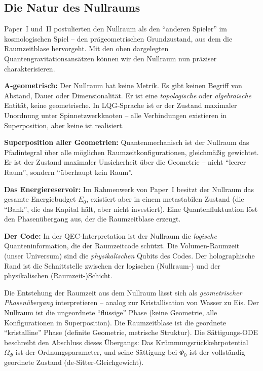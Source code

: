\documentclass[11pt,a4paper]{article}
\begin{document}
\subsection{Die Natur des Nullraums}
\label{subsec:null_space}

Paper~I und~II postulierten den Nullraum als den "`anderen Spieler"' im kosmologischen Spiel -- den pr\"ageometrischen Grundzustand, aus dem die Raumzeitblase hervorgeht. Mit den oben dargelegten Quantengravitationsans\"atzen k\"onnen wir den Nullraum nun pr\"aziser charakterisieren.

\textbf{A-geometrisch:} Der Nullraum hat keine Metrik. Es gibt keinen Begriff von Abstand, Dauer oder Dimensionalit\"at. Er ist eine \textit{topologische} oder \textit{algebraische} Entit\"at, keine geometrische. In LQG-Sprache ist er der Zustand maximaler Unordnung unter Spinnetzwerkknoten -- alle Verbindungen existieren in Superposition, aber keine ist realisiert.

\textbf{Superposition aller Geometrien:} Quantenmechanisch ist der Nullraum das Pfadintegral \"uber alle m\"oglichen Raumzeitkonfigurationen, gleichm\"a\ss ig gewichtet. Er ist der Zustand maximaler Unsicherheit \"uber die Geometrie -- nicht "`leerer Raum"', sondern "`\"uberhaupt kein Raum"'.

\textbf{Das Energiereservoir:} Im Rahmenwerk von Paper~I besitzt der Nullraum das gesamte Energiebudget $E_0$, existiert aber in einem metastabilen Zustand (die "`Bank"', die das Kapital h\"alt, aber nicht investiert). Eine Quantenfluktuation l\"ost den Phasen\"ubergang aus, der die Raumzeitblase erzeugt.

\textbf{Der Code:} In der QEC-Interpretation ist der Nullraum die \textit{logische} Quanteninformation, die der Raumzeitcode sch\"utzt. Die Volumen-Raumzeit (unser Universum) sind die \textit{physikalischen} Qubits des Codes. Der holographische Rand ist die Schnittstelle zwischen der logischen (Nullraum-) und der physikalischen (Raumzeit-)Schicht.

Die Entstehung der Raumzeit aus dem Nullraum l\"asst sich als \textit{geometrischer Phasen\"ubergang} interpretieren -- analog zur Kristallisation von Wasser zu Eis. Der Nullraum ist die ungeordnete "`fl\"ussige"' Phase (keine Geometrie, alle Konfigurationen in Superposition). Die Raumzeitblase ist die geordnete "`kristalline"' Phase (definite Geometrie, metrische Struktur). Die S\"attigungs-ODE beschreibt den Abschluss dieses \"Ubergangs: Das Kr\"ummungsr\"uckkehrpotential $\Omega_\Phi$ ist der Ordnungsparameter, und seine S\"attigung bei $\Phi_0$ ist der vollst\"andig geordnete Zustand (de-Sitter-Gleichgewicht).
\end{document}
